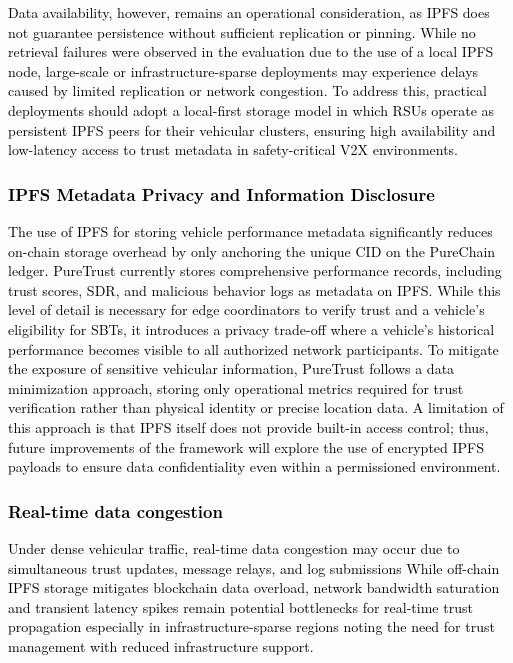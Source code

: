 \cite{cho2010survey}\documentclass[journal,comsoc,twoside]{IEEEtran}
\begin{document}
\textcolor{black}{
Data availability, however, remains an operational consideration, as IPFS does not guarantee persistence without sufficient replication or pinning. While no retrieval failures were observed in the evaluation due to the use of a local IPFS node, large-scale or infrastructure-sparse deployments may experience delays caused by limited replication or network congestion. To address this, practical deployments should adopt a local-first storage model in which RSUs operate as persistent IPFS peers for their vehicular clusters, ensuring high availability and low-latency access to trust metadata in safety-critical V2X environments.}

\textcolor{black}{
\subsubsection{IPFS Metadata Privacy and Information Disclosure} The use of IPFS for storing vehicle performance metadata significantly reduces on-chain storage overhead by only anchoring the unique CID on the PureChain ledger. PureTrust currently stores comprehensive performance records, including trust scores, SDR, and malicious behavior logs as metadata on IPFS. While this level of detail is necessary for edge coordinators to verify trust and a vehicle's eligibility for SBTs, it introduces a privacy trade-off where a vehicle’s historical performance becomes visible to all authorized network participants. To mitigate the exposure of sensitive vehicular information, PureTrust follows a data minimization approach, storing only operational metrics required for trust verification rather than physical identity or precise location data. A limitation of this approach is that IPFS itself does not provide built-in access control; thus, future improvements of the framework will explore the use of encrypted IPFS payloads to ensure data confidentiality even within a permissioned environment.
}

\textcolor{black}{
\subsubsection{Real-time data congestion}
Under dense vehicular traffic, real-time data congestion may occur due to simultaneous trust updates, message relays, and log submissions While off-chain IPFS storage mitigates blockchain data overload, network bandwidth saturation and transient latency spikes remain potential bottlenecks for real-time trust propagation especially in infrastructure-sparse regions noting the need for trust management with reduced infrastructure support.}
\end{document}
